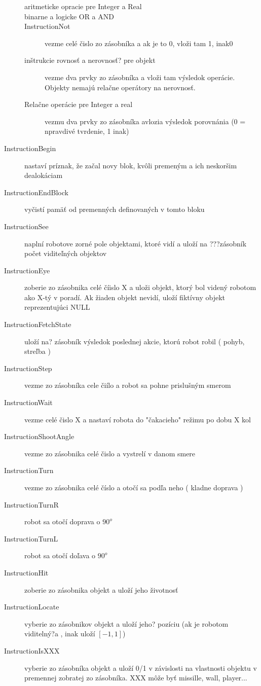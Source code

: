 \begin{description}
\begin{description}
   \item[aritmeticke opracie pre Integer a Real]
    \item [binarne a logicke OR a AND]
    \item [InstructionNot ] vezme celé čislo zo zásobníka a ak je to 0, vloži tam 1, inak0  
    \item [inštrukcie rovnosť a nerovnosť? pre objekt] vezme dva prvky zo zásobníka  a vloži tam výsledok operácie. Objekty nemajú relačne operátory na nerovnosť.
   \item [Relačne operácie pre Integer a real] vezmu dva prvky zo zásobníka avlozia výsledok porovnánia (0 = npravdivé tvrdenie, 1 inak)
\end{description}
\item [InstructionBegin] nastaví príznak, že začal novy blok, kvôli premeným a ich neskoršim dealokáciam
\item [InstructionEndBlock ] vyčistí pamäť od premenných definovaných v tomto bloku
\item [InstructionSee ] naplní robotove zorné pole objektami, ktoré vidí a uloží na ???zásobník počet viditeľných objektov
\item [InstructionEye] zoberie zo zásobnika celé číislo X a uloži objekt, ktorý bol videný robotom ako X-tý v poradí. Ak žiaden objekt nevidí, uloží fiktívny objekt reprezentujúci NULL
\item [InstructionFetchState] uloží na? zásobník výsledok poslednej akcie, ktorú robot robil ( pohyb, streľba )
\item [InstructionStep ] vezme zo zásobníka cele čiílo a robot sa pohne prislušným smerom
\item [InstructionWait ] vezme celé čislo X a nastaví robota do "čakacieho" režimu po dobu X kol
\item [InstructionShootAngle ] vezme zo zásobnika celé čislo a vystrelí v danom smere
\item [InstructionTurn] vezme zo zásobnika celé číslo a otočí sa podľa neho ( kladne doprava )
\item [InstructionTurnR ] robot sa otočí doprava o $90^o $
\item [InstructionTurnL] robot sa otočí doľava o $90^o$
\item [InstructionHit] zoberie zo zásobnika objekt a uloží jeho životnosť
\item [InstructionLocate] vyberie zo zásobnikov  objekt a uloží jeho? pozíciu (ak je robotom viditelný?a , inak uloží $[-1,1]$)
\item [InstructionIsXXX] vyberie zo zásobníka objekt a uloží 0/1 v závislosti na vlastnosti objektu v premennej zobratej zo zásobníka. XXX môže byť missille, wall, player...

\end{description}
